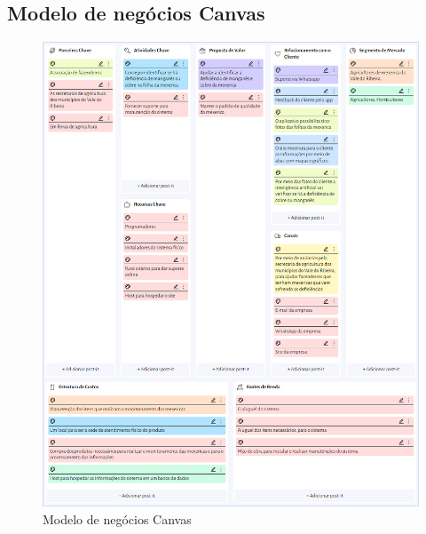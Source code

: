 
\begin{Appendix}

    \section{Modelo de negócios Canvas}%
    \label{sect:apx-a1}
    
    \begin{figure}[H]
    \centering
    \caption{Modelo de negócios Canvas}%
    \label{fig:canvaspi}
    \includegraphics[width=0.8\linewidth]{Illustrations/canvas.png}
    \end{figure}
    
\end{Appendix}
    
    
\printindex%
    